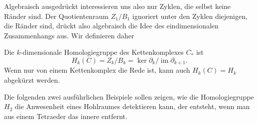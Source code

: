 Algebraisch ausgedrückt interessieren uns also nur Zyklen, die selbst
keine Ränder sind.
Der Quotientenraum $Z_1/B_1$ ignoriert unter den Zyklen diejenigen, die
Ränder sind, drückt also algebraisch die Idee des eindimensionalen
Zusammenhangs aus.
Wir definieren daher

\begin{definition}
Die $k$-dimensionale Homologiegruppe des Kettenkomplexes $C_*$ ist
\[
H_k(C) = Z_k/B_k = \ker \partial_k / \operatorname{im} \partial_{k+1}.
\]
Wenn nur von einem Kettenkomplex die Rede ist, kann auch $H_k(C)=H_k$
abgekürzt werden.
\end{definition}


Die folgenden zwei ausführlichen Beispiele sollen zeigen, wie die
Homologiegruppe $H_2$ die Anwesenheit eines Hohlraumes detektieren kann,
der entsteht, wenn man aus einem Tetraeder das innere entfernt.

